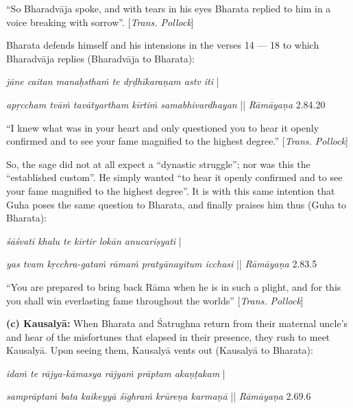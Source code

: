 “So Bharadvāja spoke, and with tears in his eyes Bharata replied to him in a voice breaking with sorrow”. [{\sl Trans. Pollock}]  

Bharata defends himself and his intensions in the verses 14 --- 18 to which Bharadvāja replies (Bharadvāja to Bharata): 

\begin{myquote}
{{\sl jāne caitan manaḥsthaṁ te dṛḍhīkaraṇam astv iti}}  |

{\sl apṛccham tvāṁ tavātyartham kīrtiṁ samabhivardhayan} || {\sl Rāmāyaṇa} 2.84.20
\end{myquote}


\begin{myquote}
“I knew what was in your heart and only questioned you to hear it openly confirmed and to see your fame magnified to the highest degree.” [{\sl Trans. Pollock}]
\end{myquote}

So, the sage did not at all expect a “dynastic struggle”; nor was this the “established custom”. He simply wanted “to hear it openly confirmed and to see your fame magnified to the highest degree”. It is with this same intention that Guha poses the same question to Bharata, and finally praises him thus (Guha to Bharata): 

\begin{myquote}
{{\sl śāśvatī khalu te kīrtir lokān anucariṣyati}} |

{\sl yas tvam kṛcchra-gataṁ rāmaṁ pratyānayitum icchasi} || {\sl Rāmāyaṇa} 2.83.5
\end{myquote}

\begin{myquote}
“You are prepared to bring back Rāma when he is in such a plight, and for this you shall win everlasting fame throughout the worlds” [{\sl Trans. Pollock}]
\end{myquote}

\noindent
\textbf{(c) Kausalyā:}  When Bharata and Śatrughna return from their maternal uncle’s and hear of the misfortunes that elapsed in their presence, they rush to meet Kausalyā. Upon seeing them, Kausalyā vents out (Kausalyā to Bharata): 

\begin{myquote}
{{\sl idaṁ te rājya-kāmasya rājyaṁ prāptam akaṇṭakam}} |

{\sl samprāptaṁ bata kaikeyyā śīghraṁ krūreṇa karmaṇā} || {\sl Rāmāyaṇa} 2.69.6
\end{myquote}

